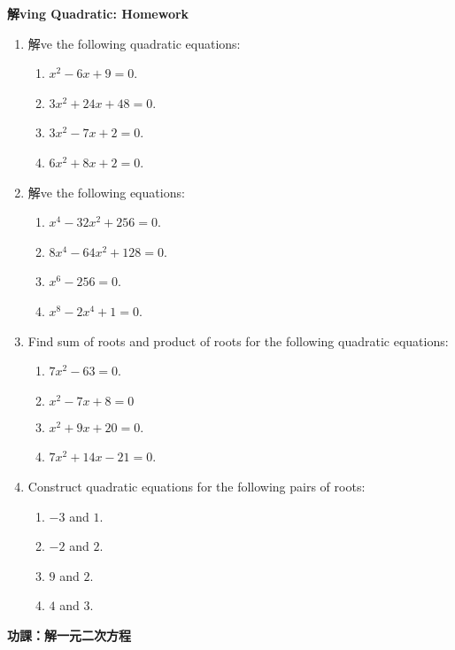 \documentclass[12pt]{article}
\begin{document}
    \begin{center}
        \textbf{解ving Quadratic: Homework}
    \end{center}

    \begin{enumerate}
        \item 解ve the following quadratic equations:\begin{enumerate}
            \item $x^2-6x+9=0$.
            \item $3x^2+24x+48=0$.
            \item $3x^2-7x+2=0$.
            \item $6x^2+8x+2=0$.
        \end{enumerate}
        \item 解ve the following equations:\begin{enumerate}
            \item $x^4-32x^2+256=0$.
            \item $8x^4-64x^2+128=0$.
            \item $x^6-256=0$.
            \item $x^8-2x^4+1=0$.
        \end{enumerate}
        \item Find sum of roots and product of roots for the following quadratic equations:\begin{enumerate}
            \item $7x^2-63=0$.
            \item $x^2-7x+8=0$
            \item $x^2+9x+20=0$.
            \item $7x^2+14x-21=0$.
        \end{enumerate}
        \item Construct quadratic equations for the following pairs of roots:\begin{enumerate}
            \item $-3$ and $1$.
            \item $-2$ and $2$.
            \item $9$ and $2$.
            \item $4$ and $3$.
        \end{enumerate}
    \end{enumerate}

    \newpage

    \begin{center}
        \textbf{功課：解一元二次方程}
    \end{center}
\end{document}
